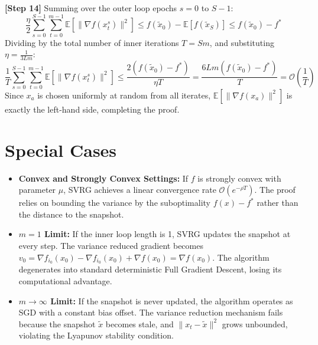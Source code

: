 \documentclass[11pt]{article}
\begin{document}
\textbf{[Step 14]} Summing over the outer loop epochs $s = 0$ to $S-1$:
\begin{equation*}
    \frac{\eta}{2} \sum_{s=0}^{S-1} \sum_{t=0}^{m-1} \mathbb{E}[\|\nabla f(x_t^s)\|^2] \le f(\tilde{x}_0) - \mathbb{E}[f(\tilde{x}_S)] \le f(\tilde{x}_0) - f^*
\end{equation*}
Dividing by the total number of inner iterations $T = Sm$, and substituting $\eta = \frac{1}{3Lm}$:
\begin{equation} \tag{Step 14}
    \frac{1}{T} \sum_{s=0}^{S-1} \sum_{t=0}^{m-1} \mathbb{E}[\|\nabla f(x_t^s)\|^2] \le \frac{2(f(\tilde{x}_0) - f^*)}{\eta T} = \frac{6Lm(f(\tilde{x}_0) - f^*)}{T} = \mathcal{O}\left(\frac{1}{T}\right)
\end{equation}
Since $x_a$ is chosen uniformly at random from all iterates, $\mathbb{E}[\|\nabla f(x_a)\|^2]$ is exactly the left-hand side, completing the proof.

\section*{Special Cases}
\begin{itemize}
    \item \textbf{Convex and Strongly Convex Settings:} If $f$ is strongly convex with parameter $\mu$, SVRG achieves a linear convergence rate $\mathcal{O}(e^{-\rho T})$. The proof relies on bounding the variance by the suboptimality $f(x) - f^*$ rather than the distance to the snapshot.
    \item \textbf{$m=1$ Limit:} If the inner loop length is 1, SVRG updates the snapshot at every step. The variance reduced gradient becomes $v_0 = \nabla f_{i_0}(x_0) - \nabla f_{i_0}(x_0) + \nabla f(x_0) = \nabla f(x_0)$. The algorithm degenerates into standard deterministic Full Gradient Descent, losing its computational advantage.
    \item \textbf{$m \to \infty$ Limit:} If the snapshot is never updated, the algorithm operates as SGD with a constant bias offset. The variance reduction mechanism fails because the snapshot $\tilde{x}$ becomes stale, and $\|x_t - \tilde{x}\|^2$ grows unbounded, violating the Lyapunov stability condition.
\end{itemize}
\end{document}
